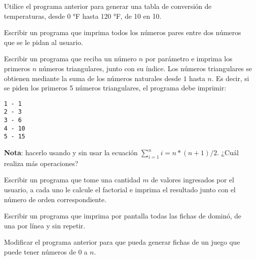 \begin{ejercicio}
Utilice el programa anterior para generar una tabla de conversión de
temperaturas, desde 0 °F hasta 120 °F, de 10 en 10.
\end{ejercicio}

\begin{ejercicio}
Escribir un programa que imprima todos los números pares entre dos números
que se le pidan al usuario.
\end{ejercicio}

\begin{ejercicio}
Escribir un programa que reciba un número $n$ por
parámetro e imprima los primeros $n$ números triangulares, junto con su
índice. Los números triangulares se obtienen mediante la suma de los números
naturales desde $1$ hasta $n$.  Es decir, si se piden los primeros 5
números triangulares, el programa debe imprimir:

\begin{verbatim}
1 - 1
2 - 3
3 - 6
4 - 10
5 - 15
\end{verbatim}

{\bf Nota}: hacerlo usando y sin usar la ecuación $\sum_{i=1}^n i = n*(n+1)/2$.
¿Cuál realiza más operaciones?
\end{ejercicio}

\begin{ejercicio}
Escribir un programa que tome una cantidad $m$ de valores ingresados
por el usuario, a cada uno le calcule el factorial e imprima el resultado
junto con el número de orden correspondiente.
\end{ejercicio}

\begin{ejercicio}
Escribir un programa que imprima por pantalla todas las fichas de dominó, de
una por línea y sin repetir.
\end{ejercicio}

\begin{ejercicio}
Modificar el programa anterior para que pueda generar fichas de un juego
que puede tener números de 0 a $n$.
\end{ejercicio}
